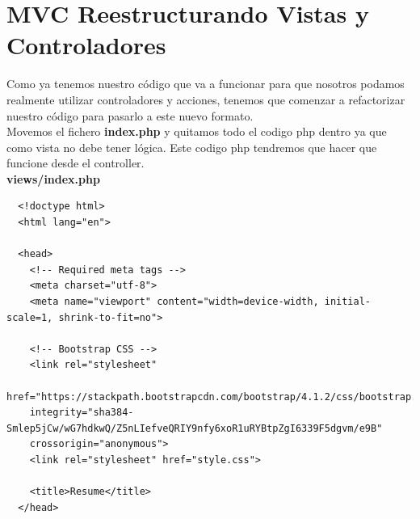 \documentclass{article}
\begin{document}
\newpage

\section{MVC Reestructurando Vistas y Controladores}%
Como ya tenemos nuestro código que va a funcionar para que nosotros podamos
realmente utilizar controladores y acciones, tenemos que comenzar a
refactorizar nuestro código para pasarlo a este nuevo formato.\\

Movemos el fichero \textbf{index.php} y quitamos todo el codigo php dentro ya
que como vista no debe tener lógica. Este codigo php tendremos que hacer que
funcione desde el controller.\\

\textbf{views/index.php}
\begin{verbatim}
  <!doctype html>
  <html lang="en">

  <head>
    <!-- Required meta tags -->
    <meta charset="utf-8">
    <meta name="viewport" content="width=device-width, initial-scale=1, shrink-to-fit=no">

    <!-- Bootstrap CSS -->
    <link rel="stylesheet"
    href="https://stackpath.bootstrapcdn.com/bootstrap/4.1.2/css/bootstrap.min.css"
    integrity="sha384-Smlep5jCw/wG7hdkwQ/Z5nLIefveQRIY9nfy6xoR1uRYBtpZgI6339F5dgvm/e9B"
    crossorigin="anonymous">
    <link rel="stylesheet" href="style.css">

    <title>Resume</title>
  </head>


\end{verbatim}
\end{document}

